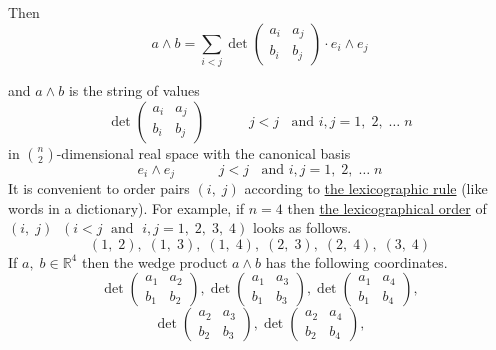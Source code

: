 \documentclass[color=black,11pt]{elegantpaper}
\begin{document}
Then
$$
a \wedge b = \sum_{i<j} \det\left( \begin{array}{cc}
                                       a_i & a_j \\
                                       b_i & b_j
                                   \end{array}\right) \cdot  e_i \wedge e_j
$$

and $a \wedge b$ is the string of values
$$
 \det\left( \begin{array}{cc}
                                       a_i & a_j \\
                                       b_i & b_j
                                   \end{array}\right) \;\;\qquad \;\; j<j\;\;\mbox{ and } i,j = 1,\;2,\;\dots \; n
$$
in $\displaystyle{ n \choose 2}$-dimensional real space with the canonical basis
$$
e_i \wedge e_j \;\;\qquad \;\; j<j\;\;\mbox{ and } i,j = 1,\;2,\;\dots \; n
$$
It is convenient to order pairs $(i,\;j)$ according to \href{https://en.wikipedia.org/wiki/Lexicographic_order}{the lexicographic rule} (like words in a dictionary).  For example, if $n=4$ then \href{https://en.wikipedia.org/wiki/Lexicographic_order}{the lexicographical order} of $(i,\;j)\;\;(i<j\;\mbox{ and }\;i,j=1,\;2,\;3,\;4)$ looks as follows.
$$
(1,\;2),\;(1,\;3),\;(1,\;4),\;(2,\;3),\;(2,\;4),\;(3,\;4)
$$
If $a,\;b \in \mathbb{R}^4$ then the wedge product $a\wedge b$ has the following coordinates.
$$
\det\left( \begin{array}{cc}
                                       a_1 & a_2 \\
                                       b_1 & b_2
                                   \end{array}\right), \det\left( \begin{array}{cc}
                                       a_1 & a_3 \\
                                       b_1 & b_3
                                   \end{array}\right), \det\left( \begin{array}{cc}
                                       a_1 & a_4 \\
                                       b_1 & b_4
                                   \end{array}\right),
$$
$$
 \det\left( \begin{array}{cc}
                                       a_2 & a_3 \\
                                       b_2 & b_3
                                   \end{array}\right), \det\left( \begin{array}{cc}
                                       a_2 & a_4 \\
                                       b_2 & b_4
                                   \end{array}\right),
$$
\end{document}

